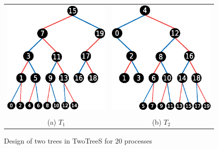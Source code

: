 \documentclass[sigplan,review,anonymous]{acmart}\settopmatter{printfolios=true,printccs=false,printacmref=false}
\begin{document}
\begin{figure}[t]
 
\begin{tabular}{cc}
\includegraphics[scale=0.47]{images/unbalanced-S-T1-gap.eps}  & \hspace{0.4cm} \includegraphics[scale=0.47]{images/unbalanced-S-T2-gap.eps} \\ \\
(a) $T_1$ & (b) $T_2$ \\
\end{tabular}
\caption{Design of two trees in TwoTreeS \cite{sanders_two-tree_2009} for $20$ processes}
\label{fig:twoTreeS}
\end{figure}
\end{document}
